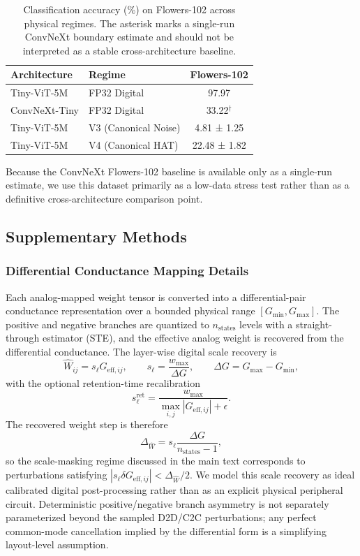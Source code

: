 \begin{table}[ht]
\centering
\caption{Classification accuracy (\%) on Flowers-102 across physical regimes. The asterisk marks a single-run ConvNeXt boundary estimate and should not be interpreted as a stable cross-architecture baseline.}
\label{tab:supp-flowers-results}
\begin{tabular}{llc}
\toprule
\textbf{Architecture} & \textbf{Regime} & \textbf{Flowers-102} \\
\midrule
Tiny-ViT-5M & FP32 Digital & 97.97 \\
ConvNeXt-Tiny & FP32 Digital & 33.22$^{\dagger}$ \\
Tiny-ViT-5M & V3 (Canonical Noise) & 4.81 ± 1.25 \\
Tiny-ViT-5M & V4 (Canonical HAT) & 22.48 ± 1.82 \\
\bottomrule
\end{tabular}
\end{table}

Because the ConvNeXt Flowers-102 baseline is available only as a single-run estimate, we use this dataset primarily as a low-data stress test rather than as a definitive cross-architecture comparison point.

\FloatBarrier

\subsection{Supplementary Methods}
\label{subsec:supp-methods}

\subsubsection{Differential Conductance Mapping Details}

Each analog-mapped weight tensor is converted into a differential-pair conductance representation over a bounded physical range $[G_{\min}, G_{\max}]$. The positive and negative branches are quantized to $n_{\mathrm{states}}$ levels with a straight-through estimator (STE), and the effective analog weight is recovered from the differential conductance. The layer-wise digital scale recovery is
\[
\hat{W}_{ij}=s_{\ell}G_{\mathrm{eff},ij},
\qquad
s_{\ell}=\frac{w_{\max}}{\Delta G},
\qquad
\Delta G = G_{\max}-G_{\min},
\]
with the optional retention-time recalibration
\[
s_{\ell}^{\mathrm{ret}}=\frac{w_{\max}}{\max_{i,j}|G_{\mathrm{eff},ij}|+\epsilon}.
\]
The recovered weight step is therefore
\[
\Delta_{\hat{W}} = s_{\ell}\frac{\Delta G}{n_{\mathrm{states}}-1},
\]
so the scale-masking regime discussed in the main text corresponds to perturbations satisfying $|s_{\ell}\delta G_{\mathrm{eff},ij}| < \Delta_{\hat{W}}/2$. We model this scale recovery as ideal calibrated digital post-processing rather than as an explicit physical peripheral circuit. Deterministic positive/negative branch asymmetry is not separately parameterized beyond the sampled D2D/C2C perturbations; any perfect common-mode cancellation implied by the differential form is a simplifying layout-level assumption.

